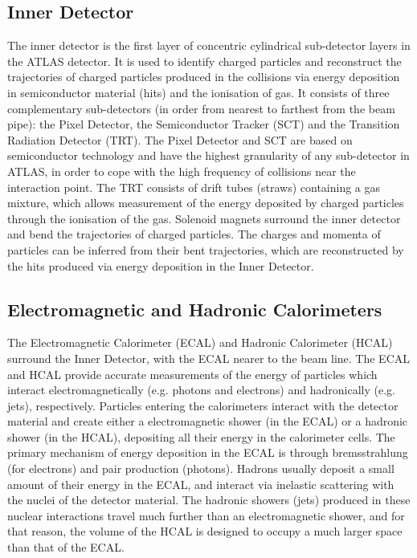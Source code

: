 

\subsection{Inner Detector}
The inner detector is the first layer of concentric cylindrical sub-detector layers in the ATLAS detector. It is used to identify charged particles and reconstruct the trajectories of charged particles produced in the collisions via energy deposition in semiconductor material (hits) and the ionisation of gas. It consists of three complementary sub-detectors (in order from nearest to farthest from the beam pipe): the Pixel Detector, the Semiconductor Tracker (SCT) and the Transition Radiation Detector (TRT). The Pixel Detector and SCT are based on semiconductor technology and have the highest granularity of any sub-detector in ATLAS, in order to cope with the high frequency of collisions near the interaction point. The TRT consists of drift tubes (straws) containing a gas mixture, which allows measurement of the energy deposited by charged particles through the ionisation of the gas. Solenoid magnets surround the inner detector and bend the trajectories of charged particles. The charges and momenta of particles can be inferred from their bent trajectories, which are reconstructed by the hits produced via energy deposition in the Inner Detector.

\subsection{Electromagnetic and Hadronic Calorimeters}
The Electromagnetic Calorimeter (ECAL) and Hadronic Calorimeter (HCAL) surround the Inner Detector, with the ECAL nearer to the beam line. The ECAL and HCAL provide accurate measurements of the energy of particles which interact electromagnetically (e.g. photons and electrons) and hadronically (e.g. jets), respectively. Particles entering the calorimeters interact with the detector material and create either a electromagnetic shower (in the ECAL) or a hadronic shower (in the HCAL), depositing all their energy in the calorimeter cells. The primary mechanism of energy deposition in the ECAL is through bremsstrahlung (for electrons) and pair production (photons). Hadrons usually deposit a small amount of their energy in the ECAL, and interact via inelastic scattering with the nuclei of the detector material. The hadronic showers (jets) produced in these nuclear interactions travel much further than an electromagnetic shower, and for that reason, the volume of the HCAL is designed to occupy a much larger space than that of the ECAL.

